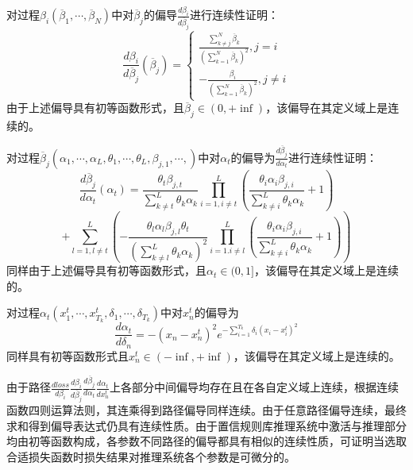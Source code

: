 \documentclass{cjc}
\begin{document}
对过程$\beta_i(\overline{\beta}_1,\cdots,\overline{\beta}_N)$中对$\overline{\beta}_j$的偏导$\frac{d\beta_i}{d\overline{\beta}_j}$进行连续性证明：
$$\frac{d\beta_i}{d\overline{\beta}_j}(\overline{\beta}_j)=
    \left\{
    \begin{aligned}
        \frac{\sum_{k\neq j}^N\overline{\beta}_k}{(\sum_{k=1}^N\overline{\beta}_k)^2},j=i \\
        -\frac{\beta_i}{(\sum_{k=1}^N\overline{\beta}_k)^2},j\neq i
    \end{aligned}
    \right.$$
由于上述偏导具有初等函数形式，且$\overline{\beta}_j\in(0,+\inf)$，该偏导在其定义域上是连续的。

对过程$\overline{\beta}_j(\alpha_1,\cdots,\alpha_L,\theta_1,\cdots,\theta_L,\beta_{j,1},\cdots,)$中对$\alpha_t$的偏导为$\frac{d\overline{\beta}_j}{d\alpha_t}$进行连续性证明：
$$\frac{d\overline{\beta}_j}{d\alpha_t}(\alpha_t)=\frac{\theta_t\beta_{j,t}}{\sum_{k\neq t}^L\theta_k\alpha_k}\prod_{i=1,i\neq t}^L(\frac{\theta_i\alpha_i\beta_{j,i}}{\sum_{k\neq i}^L{\theta_k\alpha_k}}+1)$$
$$+\sum_{l=1,l\neq t}^L(-\frac{\theta_l\alpha_l\beta_{j,l}\theta_t}{(\sum_{k\neq l}^L\theta_k\alpha_k)^2}\prod_{i=1.i\neq l}^L(\frac{\theta_i\alpha_i\beta_{j,i}}{\sum_{k\neq i}^L{\theta_k\alpha_k}}+1))$$
同样由于上述偏导具有初等函数形式，且$\alpha_t\in(0,1]$，该偏导在其定义域上是连续的。

对过程$\alpha_t(x_1^t,\cdots,x_{T_k}^t,\delta_1,\cdots,\delta_{T_k})$中对$x_n^t$的偏导为$$\frac{d\alpha_t}{d\delta_n}=-(x_n-x_n^t)^{2}e^{-\sum_{i=1}^{T_k}\delta_i(x_i-x_i^t)^2}$$
同样具有初等函数形式且$x_n^t\in(-\inf,+\inf)$，该偏导在其定义域上是连续的。

由于路径$\frac{dloss}{d\beta_i}\frac{d\beta_i}{d\overline{\beta}_j}\frac{d\overline{\beta}_j}{d\alpha_t}\frac{d\alpha_t}{dx_n^t}$上各部分中间偏导均存在且在各自定义域上连续，根据连续函数四则运算法则，其连乘得到路径偏导同样连续。由于任意路径偏导连续，最终求和得到偏导表达式仍具有连续性质。由于置信规则库推理系统中激活与推理部分均由初等函数构成，各参数不同路径的偏导都具有相似的连续性质，可证明当选取合适损失函数时损失结果对推理系统各个参数是可微分的。


\makebiographies
\end{document}
